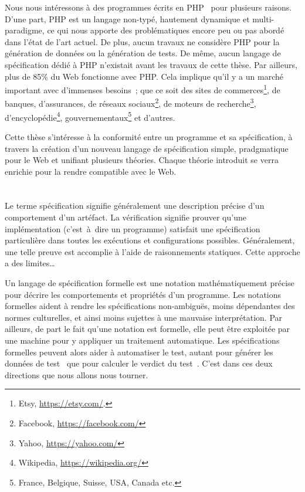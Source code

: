 Nous nous intéressons à des programmes écrits en PHP~ pour plusieurs
raisons. D'une part, PHP est un langage non-typé, hautement dynamique et
multi-paradigme, ce qui nous apporte des problématiques encore peu ou pas abordé
dans l'état de l'art actuel.  De plus, aucun travaux ne considère PHP pour la
génération de données ou la génération de tests. De même, aucun langage de
spécification dédié à PHP n'existait avant les travaux de cette thèse. Par
ailleurs, plus de 85\% du Web fonctionne avec PHP. Cela implique qu'il y a un
marché important avec d'immenses besoins~; que ce soit des sites de
commerces\footnote{Etsy, \url{https://etsy.com/}.}, de banques, d'assurances, de
réseaux sociaux\footnote{Facebook, \url{https://facebook.com/}}, de moteurs de
recherche\footnote{Yahoo, \url{https://yahoo.com/}},
d'encyclopédie\footnote{Wikipedia, \url{https://wikipedia.org/}},
gouvernementaux\footnote{France, Belgique, Suisse, USA, Canada etc.} et
d'autres.

Cette thèse s'intéresse à la conformité entre un programme et sa spécification,
à travers la création d'un nouveau langage de spécification simple, pradgmatique
pour le Web et unifiant plusieurs théories. Chaque théorie introduit se verra
enrichie pour la rendre compatible avec le Web.

\section{}
\label{section:sota:bisl}

Le terme {\strong spécification} signifie généralement une description précise
d'un comportement d'un artéfact. La {\strong vérification} signifie prouver
qu'une implémentation (c'est~à~dire un programme) satisfait une spécification
particulière dans toutes les exécutions et configurations possibles.
Généralement, une telle preuve est accomplie à l'aide de raisonnements statiques.
Cette approche a des limites…

Un {\strong langage de spécification} formelle est une notation mathématiquement
précise pour décrire les comportements et propriétés d'un programme. Les
{\strong notations formelles} aident à rendre les spécifications non-ambiguës,
moins dépendantes des normes culturelles, et ainsi moins sujettes à une mauvaise
interprétation. Par ailleurs, de part le fait qu'une notation est formelle, elle
peut être exploitée par une machine pour y appliquer un traitement automatique.
Les spécifications formelles peuvent alors aider à {\strong automatiser le
test}, autant pour générer les données de test~ que pour calculer le verdict du test~.
C'est dans ces deux directions que nous allons nous tourner.

